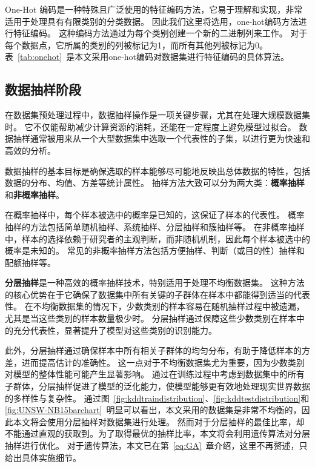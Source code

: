 One-Hot 编码是一种特殊且广泛使用的特征编码方法，它易于理解和实现，非常适用于处理具有有限类别的分类数据。
因此我们这里将选用，one-hot编码方法进行特征编码。
这种编码方法通过为每个类别创建一个新的二进制列来工作。
对于每个数据点，它所属的类别的列被标记为1，而所有其他列被标记为0。
表~\ref{tab:onehot}~是本文采用one-hot编码对数据集进行特征编码的具体算法。


\subsection{数据抽样阶段}
在数据集预处理过程中，数据抽样操作是一项关键步骤，尤其在处理大规模数据集时。
它不仅能帮助减少计算资源的消耗，还能在一定程度上避免模型过拟合。
数据抽样通常被用来从一个大型数据集中选取一个代表性的子集，以进行更为快速和高效的分析。\par
数据抽样的基本目标是确保选取的样本能够尽可能地反映出总体数据的特性，包括数据的分布、均值、方差等统计属性。
抽样方法大致可以分为两大类：\textbf{概率抽样}和\textbf{非概率抽样}。\par

在概率抽样中，每个样本被选中的概率是已知的，这保证了样本的代表性。
概率抽样的方法包括简单随机抽样、系统抽样、分层抽样和簇抽样等。
在非概率抽样中，样本的选择依赖于研究者的主观判断，而非随机机制，因此每个样本被选中的概率是未知的。
常见的非概率抽样方法包括方便抽样、判断（或目的性）抽样和配额抽样等。\par


\textbf{分层抽样}是一种高效的概率抽样技术，特别适用于处理不均衡数据集。
这种方法的核心优势在于它确保了数据集中所有关键的子群体在样本中都能得到适当的代表性。
在不均衡数据集的情况下，少数类别的样本容易在随机抽样过程中被遗漏，尤其是当这些类别的样本数量极少时。
分层抽样通过保障这些少数类别在样本中的充分代表性，显著提升了模型对这些类别的识别能力。\par

此外，分层抽样通过确保样本中所有相关子群体的均匀分布，有助于降低样本的方差，进而提高估计的准确性。
这一点对于不均衡数据集尤为重要，因为少数类别对模型的整体性能可能产生显著影响。
通过在训练过程中考虑到数据集中的所有子群体，分层抽样促进了模型的泛化能力，使模型能够更有效地处理现实世界数据的多样性与复杂性。
通过图~\ref{fig:kddtraindistribution}、\ref{fig:kddtestdistribution}和\ref{fig:UNSW-NB15barchart}~明显可以看出，本文采用的数据集是非常不均衡的，因此本文将会使用分层抽样对数据集进行处理。
然而对于分层抽样的最佳比率，却不能通过直观的获取到。为了取得最优的抽样比率，本文将会利用遗传算法对分层抽样进行优化。
对于遗传算法，本文已在第~\ref{eq:GA}~章介绍，这里不再赘述，只给出具体实施细节。\par

